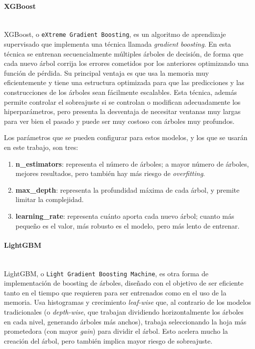 \documentclass[a4paper,onecolumn]{extarticle}
\begin{document}
\begin{sloppypar}
\paragraph{XGBoost} \label{XGB}\mbox{} \\
XGBoost, o \texttt{eXtreme Gradient Boosting}, es un algoritmo de aprendizaje supervisado que implementa una técnica llamada \textit{gradient boosting}. En esta técnica se 
entrenan secuencialmente múltiples árboles de decisión, de forma que cada nuevo árbol corrija los errores cometidos por los anteriores optimizando una función de pérdida. Su 
principal ventaja es que usa la memoria muy eficientemente y tiene una estructura optimizada para que las predicciones y las construcciones de los árboles sean fácilmente escalables.
Esta técnica, además permite controlar el sobreajuste si se controlan o modifican adecuadamente los hiperparámetros, pero presenta la desventaja de necesitar ventanas muy largas 
para ver bien el pasado y puede ser muy costoso con árboles muy profundos.

Los parámetros que se pueden configurar para estos modelos, y los que se usarán en este trabajo, son tres:
\begin{enumerate}
    \item \textbf{n\_estimators}: representa el número de árboles; a mayor número de árboles, mejores resultados, pero también hay más riesgo de \textit{overfitting}.
    \item \textbf{max\_depth}: representa la profundidad máxima de cada árbol, y premite limitar la complejidad.
    \item \textbf{learning\_rate}: representa cuánto aporta cada nuevo árbol; cuanto más pequeño es el valor, más robusto es el modelo, pero más lento de entrenar.
\end{enumerate}

\paragraph{LightGBM} \label{LGBM}\mbox{} \\
LightGBM, o \texttt{Light Gradient Boosting Machine}, es otra forma de implementación de boosting de árboles, diseñado con el objetivo de ser eficiente tanto en el tiempo 
que requieren para ser entrenados como en el uso de la memoria. Usa histogramas y crecimiento \textit{leaf-wise} que, al contrario de los modelos tradicionales (o \textit{depth-wise},
que trabajan dividiendo horizontalmente los árboles en cada nivel, generando árboles más anchos), trabaja seleccionando la hoja más prometedora (con mayor \textit{gain}) para dividir
el árbol. Esto acelera mucho la creación del árbol, pero también implica mayor riesgo de sobreajuste.


\end{sloppypar}
\end{document}
